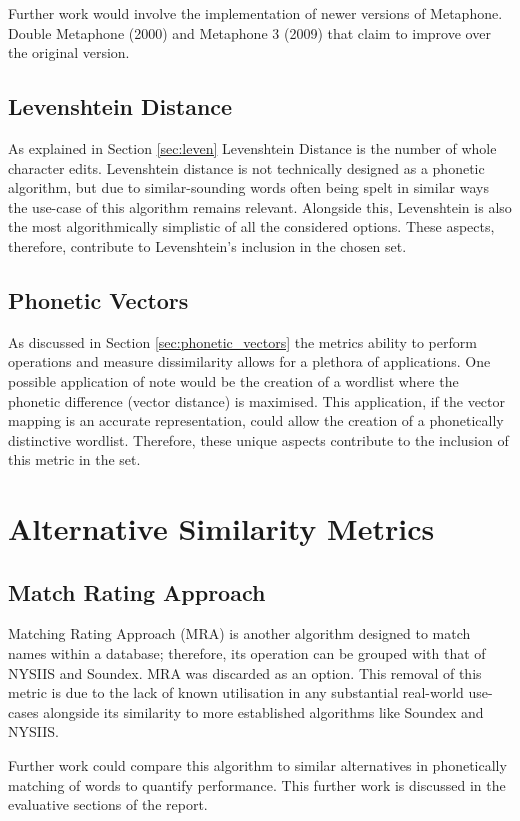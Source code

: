 Further work would involve the implementation of newer versions of Metaphone. Double Metaphone (2000) and
Metaphone 3 (2009) that claim to improve over the original version.

\subsection{Levenshtein Distance}
As explained in Section \ref{sec:leven} Levenshtein Distance is the number of whole character edits. Levenshtein distance is not technically designed as a phonetic algorithm, but due to similar-sounding words often being spelt in similar ways\cite{hettiarachchi2012sparcl} the use-case of this algorithm remains relevant. Alongside this, Levenshtein is also the most algorithmically simplistic of all the considered options. These aspects, therefore, contribute to Levenshtein's inclusion in the chosen set.

\subsection{Phonetic Vectors}
As discussed in Section \ref{sec:phonetic_vectors} the metrics ability to perform operations and measure dissimilarity allows for a plethora of applications. One possible application of note would be the creation of a wordlist where the phonetic difference (vector distance) is maximised. This application, if the vector mapping is an accurate representation, could allow the creation of a phonetically distinctive wordlist. Therefore, these unique aspects contribute to the inclusion of this metric in the set.

\section{Alternative Similarity Metrics}

\subsection{Match Rating Approach}
Matching Rating Approach (MRA) is another algorithm designed to match names within a database; therefore, its operation can be grouped with that of NYSIIS and Soundex. MRA was discarded as an option. This removal of this metric is due to the lack of known utilisation in any substantial real-world use-cases alongside its similarity to  more established algorithms like Soundex and NYSIIS.

Further work could compare this algorithm to similar alternatives in phonetically matching of words to quantify performance. This further work is discussed in the evaluative sections of the report.

